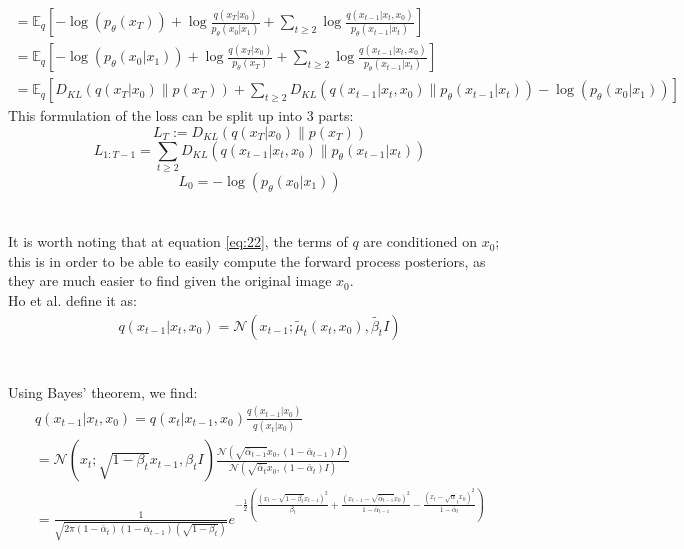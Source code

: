 \documentclass{article}
\begin{document}
\begin{gather}
  = \mathbb{E}_q \left[-\log\left(p_{\theta}\left(x_T\right)\right) + \log \frac{q\left(x_T | x_0\right)}{p_{\theta}\left(x_0 | x_1\right)} + \sum_{t \geq 2} \log \frac{q\left(x_{t-1} | x_t, x_0\right)}{p_{\theta}\left(x_{t-1} | x_t\right)}\right] \label{eq:25} \\
  = \mathbb{E}_q \left[- \log\left(p_{\theta}\left(x_0 | x_1\right)\right) + \log \frac{q\left(x_T | x_0\right)}{p_{\theta}\left(x_T\right)} + \sum_{t \geq 2} \log \frac{q\left(x_{t-1} | x_t, x_0\right)}{p_{\theta}\left(x_{t-1} | x_t\right)}\right] \label{eq:26} \\
  = \mathbb{E}_q \left[ D_{KL}\left(q\left(x_T | x_0\right) \| p\left(x_T\right)\right) + \sum_{t \geq 2} D_{KL}\left(q\left(x_{t-1} | x_t, x_0\right) \| p_{\theta}\left(x_{t-1} | x_t\right)\right) - \log\left(p_{\theta}\left(x_0 | x_1\right)\right)\right] \label{eq:27}
\end{gather}
This formulation of the loss can be split up into 3 parts:
$$ L_T := D_{KL}\left(q\left(x_T | x_0\right) \| p\left(x_T\right)\right) $$
$$ L_{1:T-1} = \sum_{t \geq 2} D_{KL}\left(q\left(x_{t-1} | x_t, x_0\right) \| p_{\theta}\left(x_{t-1} | x_t\right)\right)$$
$$ L_0 =  - \log\left(p_{\theta}\left(x_0 | x_1\right)\right)$$
\\\\
It is worth noting that at equation \ref{eq:22}, the terms of $q$ are conditioned on $x_0$; this is in order to be able to easily compute the forward process posteriors, as they are much easier to find given the original image $x_0$. \\
Ho et al. \cite{ho2020denoising} define it as:
\begin{gather}
  q\left(x_{t-1} | x_t, x_0\right) = \mathcal{N}\left(x_{t-1}; \tilde{\mu}_t \left(x_t, x_0\right), \tilde{\beta_t} I\right) \label{eq:28}
\end{gather}
\\\\
Using Bayes' theorem, we find:
\begin{gather}
  q\left(x_{t-1} | x_t, x_0\right) = q\left(x_t | x_{t-1}, x_0\right) \frac{q\left(x_{t-1}| x_0\right)}{q\left(x_t | x_0\right)} \label{eq:29} \\
  = \mathcal{N}\left(x_t; \sqrt{1 - \beta_t}x_{t-1}, \beta_t I\right) \frac{\mathcal{N}\left(\sqrt{\bar{\alpha}_{t-1}} x_0, \left(1 - \bar{\alpha}_{t-1}\right)I\right)}{\mathcal{N}\left(\sqrt{\bar{\alpha}_t} x_0, \left(1 - \bar{\alpha}_t\right)I\right)} \\
  = \frac{1}{\sqrt{2 \pi \left(1 - \bar{\alpha}_t\right) \left(1 - \bar{\alpha}_{t-1}\right) \left(\sqrt{1 - \beta_t}\right)}} e^{- \frac{1}{2} \left(\frac{\left(x_t - \sqrt{1 - \beta_t}x_{t-1}\right)^2}{\beta_t} + \frac{\left(x_{t-1} - \sqrt{\bar{\alpha}_{t-1}}x_0\right)^2}{1 - \bar{\alpha}_{t-1}} - \frac{\left(x_t - \sqrt{\alpha}_t x_0\right)^2}{1 - \bar{\alpha}_{t}}\right)}
\end{gather}
\end{document}

